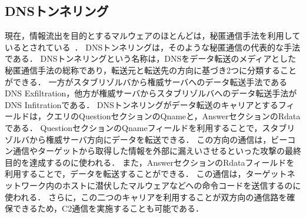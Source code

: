 \subsection{DNSトンネリング}
\label{sec:dns-tunneling}
現在，情報流出を目的とするマルウェアのほとんどは，秘匿通信手法を利用しているとされている~\cite{asaf}．
DNSトンネリングは，そのような秘匿通信の代表的な手法である．
DNSトンネリングという名称は，DNSをデータ転送のメディアとした秘匿通信手法の総称であり，転送元と転送先の方向に基づき2つに分類することができる．
一方がスタブリゾルバから権威サーバへのデータ転送手法であるDNS Exfiltration，他方が権威サーバからスタブリゾルバへのデータ転送手法がDNS Infitrationである．
%
%
DNSトンネリングがデータ転送のキャリアとするフィールドは，クエリのQuestionセクションのQnameと，AnswerセクションのRdataである．
QuestionセクションのQnameフィールドを利用することで，スタブリゾルバから権威サーバ方向にデータを転送できる．
この方向の通信は，ビーコン通信やターゲットから取得した情報を外部に漏えいさせるといった攻撃の最終目的を達成するのに使われる．
また，AnswerセクションのRdataフィールドを利用することで，データを転送することができる．
この通信は，ターゲットネットワーク内のホストに潜伏したマルウェアなどへの命令コードを送信するのに使われる．
さらに，この二つのキャリアを利用することが双方向の通信路を確保できるため，C2通信を実施することも可能である．

